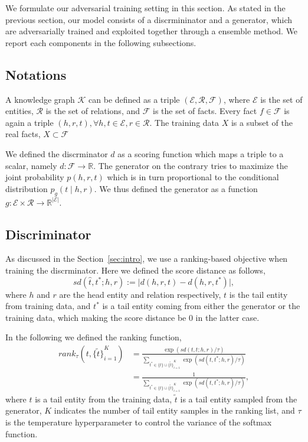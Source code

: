 \documentclass[twocolumn,a4paper,10pt,review,3p]{elsarticle}
\begin{document}
We formulate our adversarial training setting in this section. As stated in the previous section, our model consists of a discrmininator and a generator, which are adversarially trained and exploited together through a ensemble method. We report each components in the following subsections.

\subsection{Notations}

A knowledge graph $\mathcal{K}$ can be defined as a triple $(\mathcal{E}, \mathcal{R}, \mathcal{F})$, where $\mathcal{E}$ is the set of entities, $\mathcal{R}$ is the set of relations, and $\mathcal{F}$ is the set of facts. Every fact $f\in \mathcal{F}$ is again a triple $(h, r, t), \forall h,t\in\mathcal{E}, r\in\mathcal{R}$. The training data $X$ is a subset of the real facts, $X \subset \mathcal{F}$

We defined the discrminator $d$ as a scoring function which maps a triple to a scalar, namely $d: \mathcal{F}\rightarrow \mathbb{R}$. The generator on the contrary tries to maximize the joint probability $p(h, r, t)$ which is in turn proportional to the conditional distribution $p_g(t \mid h, r)$. We thus defined the generator as a function $g: \mathcal{E} \times \mathcal{R} \rightarrow \mathbb{R}^{\lvert \mathcal{E} \rvert}$.

\subsection{Discriminator}

As discussed in the Section~\ref{sec:intro}, we use a ranking-based objective when training the discrminator. Here we defined the score distance as follows,
\[
    sd(\hat t, t^*; h, r) := \lvert d(h, r, t) - d(h, r, t^*) \rvert,
\]
where $h$ and $r$ are the head entity and relation respectively, $t$ is the tail entity from training data, and $t^*$ is a tail entity coming from either the generator or the training data, which making the score distance be 0 in the latter case.

In the following we defined the ranking function,
\begin{align*}
    rank_\tau(t, {\{\tilde t \}}_{i=1}^K)
    &= \frac{\exp(sd(t, t; h, r) / \tau)}
        {\sum_{t^*\in \{t\} \cup {\{\tilde t \}}_{i=1}^K } \exp (sd(t, t^*; h, r) / \tau) } \\
    &= \frac{1}
        {\sum_{t^*\in \{t\} \cup {\{\tilde t \}}_{i=1}^K } \exp (sd(t, t^*; h, r) / \tau) },
\end{align*}
where $t$ is a tail entity from the training data, $\tilde t$ is a tail entity sampled from the generator, $K$ indicates the number of tail entity samples in the ranking list, and $\tau$ is the temperature hyperparameter to control the variance of the softmax function.
\end{document}
